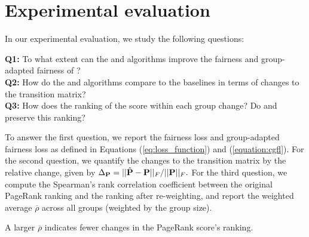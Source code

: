 \documentclass[sigconf, anonymous, review]{acmart}
\begin{document}
\section{Experimental evaluation}



In our experimental evaluation, we study the following questions:

\vspace{1mm}
\noindent \textbf{Q1:} To what extent can the \fairgd and \crossgd algorithms improve the fairness and group-adapted fairness of \pagerank? 
\vspace{1mm}\\ 
\textbf{Q2:} 
How do the \fairgd and \crossgd algorithms compare to the baselines in terms of changes to the transition matrix? 
\vspace{1mm}\\ 
\textbf{Q3:} How does the ranking of the \pagerank score within each group change? Do \fairgd and \crossgd preserve this ranking?

\vspace{1mm}
To answer the first question, we report the fairness loss and group-adapted fairness loss as defined in Equations
(\ref{eq:loss_function}) and (\ref{equation:cgfl}). 
For the second question, we quantify the changes to the transition matrix by the relative change, 
given by
$  \Delta_\mathbf{{P}} = {||\hat{\mathbf{{P}}} - \mathbf{{P}}||_F}/{||\mathbf{{P}}||_F}.$
For the third question, we compute the Spearman's rank correlation coefficient 
\citep{spearman1961proof} between the original PageRank ranking and the ranking after re-weighting, 
and report the weighted average $\overline{\rho}$ across all groups 
(weighted by the group size).

A larger $\overline{\rho}$ indicates fewer changes in the PageRank score's ranking.
\end{document}
